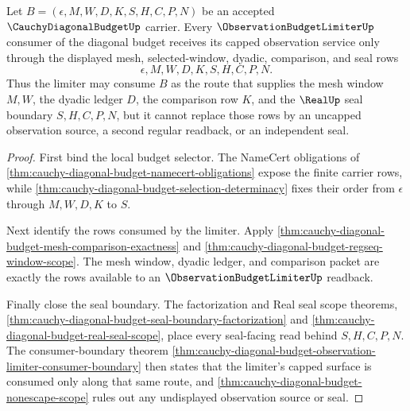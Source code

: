 \begin{theorem}
\label{thm:cauchy-diagonal-budget-observation-limiter-consumption}
Let $B=(\epsilon,M,W,D,K,S,H,C,P,N)$ be an accepted $\CauchyDiagonalBudgetUp$ carrier. Every $\ObservationBudgetLimiterUp$ consumer of the diagonal budget receives its capped observation service only through the displayed mesh, selected-window, dyadic, comparison, and seal rows
$$
\epsilon,M,W,D,K,S,H,C,P,N.
$$
Thus the limiter may consume $B$ as the route that supplies the mesh window $M,W$, the dyadic ledger $D$, the comparison row $K$, and the $\RealUp$ seal boundary $S,H,C,P,N$, but it cannot replace those rows by an uncapped observation source, a second regular readback, or an independent seal.
\end{theorem}
\begin{proof}
First bind the local budget selector. The NameCert obligations of \autoref{thm:cauchy-diagonal-budget-namecert-obligations} expose the finite carrier rows, while \autoref{thm:cauchy-diagonal-budget-selection-determinacy} fixes their order from $\epsilon$ through $M,W,D,K$ to $S$.

Next identify the rows consumed by the limiter. Apply \autoref{thm:cauchy-diagonal-budget-mesh-comparison-exactness} and \autoref{thm:cauchy-diagonal-budget-regseq-window-scope}. The mesh window, dyadic ledger, and comparison packet are exactly the rows available to an $\ObservationBudgetLimiterUp$ readback.

Finally close the seal boundary. The factorization and Real seal scope theorems, \autoref{thm:cauchy-diagonal-budget-seal-boundary-factorization} and \autoref{thm:cauchy-diagonal-budget-real-seal-scope}, place every seal-facing read behind $S,H,C,P,N$. The consumer-boundary theorem \autoref{thm:cauchy-diagonal-budget-observation-limiter-consumer-boundary} then states that the limiter's capped surface is consumed only along that same route, and \autoref{thm:cauchy-diagonal-budget-nonescape-scope} rules out any undisplayed observation source or seal.
\end{proof}


